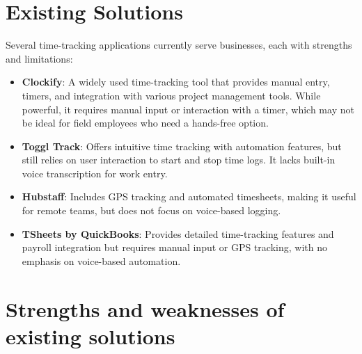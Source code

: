 \documentclass[
  digital,     %
  oneside,     %
  nosansbold,  %
  nocolorbold, %
  lof,         %
  lot,         %
]{fithesis4}
\begin{document}
\section{Existing Solutions}

Several time-tracking applications currently serve businesses, each with strengths and limitations:

\begin{itemize}
\item \textbf{Clockify}: A widely used time-tracking tool that provides manual entry, timers, and integration with various project management tools. While powerful, it requires manual input or interaction with a timer, which may not be ideal for field employees who need a hands-free option.
\item \textbf{Toggl Track}: Offers intuitive time tracking with automation features, but still relies on user interaction to start and stop time logs. It lacks built-in voice transcription for work entry.
\item \textbf{Hubstaff}: Includes GPS tracking and automated timesheets, making it useful for remote teams, but does not focus on voice-based logging.
\item \textbf{TSheets by QuickBooks}: Provides detailed time-tracking features and payroll integration but requires manual input or GPS tracking, with no emphasis on voice-based automation.
\end{itemize}

\section{Strengths and weaknesses of existing solutions}
\end{document}
